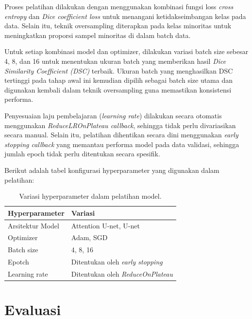 Proses pelatihan dilakukan dengan menggunakan kombinasi fungsi loss \textit{cross entropy} dan \textit{Dice coefficient loss} untuk menangani ketidakseimbangan kelas pada data. Selain itu, teknik oversampling diterapkan pada kelas minoritas untuk meningkatkan proporsi sampel minoritas di dalam batch data.

Untuk setiap kombinasi model dan optimizer, dilakukan variasi batch size sebesar 4, 8, dan 16 untuk menentukan ukuran batch yang memberikan hasil \textit{Dice Similarity Coefficient (DSC)} terbaik. Ukuran batch yang menghasilkan DSC tertinggi pada tahap awal ini kemudian dipilih sebagai batch size utama dan digunakan kembali dalam teknik oversampling guna memastikan konsistensi performa.

Penyesuaian laju pembelajaran (\textit{learning rate}) dilakukan secara otomatis menggunakan \textit{ReduceLROnPlateau callback}, sehingga tidak perlu divariasikan secara manual. Selain itu, pelatihan dihentikan secara dini menggunakan \textit{early stopping callback} yang memantau performa model pada data validasi, sehingga jumlah epoch tidak perlu ditentukan secara spesifik.

Berikut adalah tabel konfigurasi hyperparameter yang digunakan dalam pelatihan:

\begin{table}[h]
	\centering
	\caption{Variasi hyperparameter dalam pelatihan model.}
	\label{tab:hyperparameter}
	\begin{tabular}{lllll}
		\hline
		\textbf{Hyperparameter} & \multicolumn{4}{l}{\textbf{Variasi}}                  \\ \hline
		Arsitektur Model        & \multicolumn{4}{l}{Attention U-net, U-net}            \\
		Optimizer               & \multicolumn{4}{l}{Adam, SGD}                         \\
		Batch size              & \multicolumn{4}{l}{4, 8, 16}                          \\
		Epotch                  & \multicolumn{4}{l}{Ditentukan oleh \textit{early stopping}}    \\
		Learning rate           & \multicolumn{4}{l}{Ditentukan oleh \textit{ReduceOnPlateau}} \\ \hline
	\end{tabular}
\end{table}


\section{Evaluasi}

